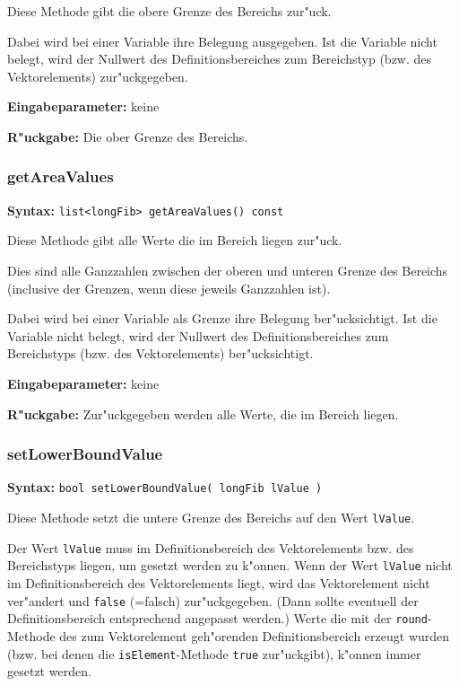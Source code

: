 \bigskip\noindent
Diese Methode gibt die obere Grenze des Bereichs zur"uck.

Dabei wird bei einer Variable ihre Belegung ausgegeben. Ist die Variable nicht belegt, wird der Nullwert des Definitionsbereiches zum Bereichstyp (bzw. des Vektorelements) zur"uckgegeben.

\bigskip\noindent
\textbf{Eingabeparameter:} keine

\bigskip\noindent
\textbf{R"uckgabe:} Die ober Grenze des Bereichs.


\subsubsection{getAreaValues}

\textbf{Syntax:} \verb|list<longFib> getAreaValues() const|

\bigskip\noindent
Diese Methode gibt alle Werte die im Bereich liegen zur"uck.

Dies sind alle Ganzzahlen zwischen der oberen und unteren Grenze des Bereichs (inclusive der Grenzen, wenn diese jeweils Ganzzahlen ist).

Dabei wird bei einer Variable als Grenze ihre Belegung ber"ucksichtigt. Ist die Variable nicht belegt, wird der Nullwert des Definitionsbereiches zum Bereichstyps (bzw. des Vektorelements) ber"ucksichtigt.

\bigskip\noindent
\textbf{Eingabeparameter:} keine

\bigskip\noindent
\textbf{R"uckgabe:} Zur"uckgegeben werden alle Werte, die im Bereich liegen.


\subsubsection{setLowerBoundValue}

\textbf{Syntax:} \verb|bool setLowerBoundValue( longFib lValue )|

\bigskip\noindent
Diese Methode setzt die untere Grenze des Bereichs auf den Wert \verb|lValue|.

Der Wert \verb|lValue| muss im Definitionsbereich des Vektorelements bzw. des Bereichstyps liegen, um gesetzt werden zu k"onnen. Wenn der Wert \verb|lValue| nicht im Definitionsbereich des Vektorelements liegt, wird das Vektorelement nicht ver"andert und \verb|false| (=falsch) zur"uckgegeben. (Dann sollte eventuell der Definitionsbereich entsprechend angepasst werden.) Werte die mit der \verb|round|-Methode des zum Vektorelement geh"orenden Definitionsbereich erzeugt wurden (bzw. bei denen die \verb|isElement|-Methode \verb|true| zur"uckgibt), k"onnen immer gesetzt werden.

